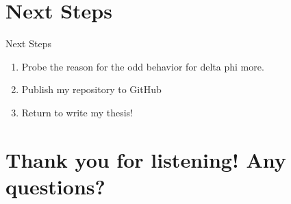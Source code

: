 \documentclass[10pt]{beamer}
\begin{document}
\section{Next Steps}

\begin{frame}{Next Steps}
\begin{enumerate}
    \item Probe the reason for the odd behavior for delta phi more. 
    \item Publish my repository to GitHub
    \item Return to write my thesis!
\end{enumerate}

    
\end{frame}

\section{Thank you for listening! Any questions?}
\end{document}
